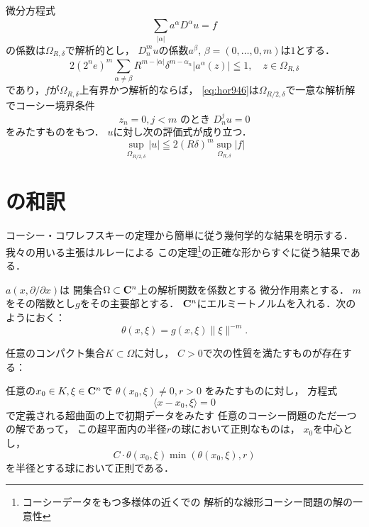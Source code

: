 \begin{THM}
    微分方程式
    \begin{equation}\label{eq:hor946}
        \sum_{\lvert{\alpha}\rvert}^{}a^{\alpha}D^{\alpha}u=f
    \end{equation}
    の係数は\(\varOmega_{R,\delta}\)で解析的とし，
    \(D_n^{m}u\)の係数\(a^{\beta}\), 
    \(\beta=(0,\dots,0,m)\)は\(1\)とする．
    \begin{equation}\label{eq:hor947}
        2(2^ne)^m\sum_{\alpha\ne\beta}^{}R^{m-\lvert\alpha\rvert}\delta^{m-\alpha_n}\lvert a^\alpha(z)\rvert\leqq1,\quad z\in\varOmega_{R,\delta}
    \end{equation}
    であり，\(f\)が\(\varOmega_{R,\delta}\)上有界かつ解析的ならば，
    \eqref{eq:hor946}は\(\varOmega_{R/2,\delta}\)で一意な解析解でコーシー境界条件\begin{equation}
        z_n=0,j<m\text{ のとき }D^{j}_{n}u=0
    \end{equation}をみたすものをもつ．
    \(u\)に対し次の評価式が成り立つ．
    \begin{equation}
        \sup_{\varOmega_{R/2,\delta}}\lvert u\rvert
        \leqq 
        2(R\delta)^{m}\sup_{\varOmega_{R,\delta}}\lvert{f}\rvert
    \end{equation}
\end{THM}




\section{\cite{Zer71}の和訳}

コーシー・コワレフスキーの定理から簡単に従う幾何学的な結果を明示する．
我々の用いる主張はルレーによる
この定理\footnote{
    コーシーデータをもつ多様体の近くでの
    解析的な線形コーシー問題の解の一意性
}の正確な形からすぐに従う結果である．

\begin{NTN}
    \(a(x,\partial/\partial x)\)は
    開集合\(\Omega\subset\mathbf{C}^n\)上の解析関数を係数とする
    微分作用素とする．
    \(m\)をその階数とし\(g\)をその主要部とする．
    \(\mathbf{C}^n\)にエルミートノルムを入れる．次のようにおく：
    \[
        \theta(x,\xi)=g(x,\xi)\lVert\xi\rVert^{-m}.
    \]
\end{NTN}

\begin{THM}
    任意のコンパクト集合\(K\subset\Omega\)に対し，
    \(C>0\)で次の性質を満たすものが存在する：
    
    任意の\(x_0\in K,\xi\in\mathbf{C}^n\)で
    \(\theta(x_0,\xi)\ne0, r>0\)
    をみたすものに対し，
    方程式
    \[
        \langle x-x_0,\xi\rangle=0
    \]で定義される超曲面の上で初期データをみたす
    任意のコーシー問題のただ一つの解であって，
    この超平面内の半径\(r\)の球において正則なものは，
    \(x_0\)を中心とし，
    \[
        C\cdot\theta(x_0,\xi)\min\left(\theta(x_0,\xi),r\right)
    \]
    を半径とする球において正則である．
\end{THM}

